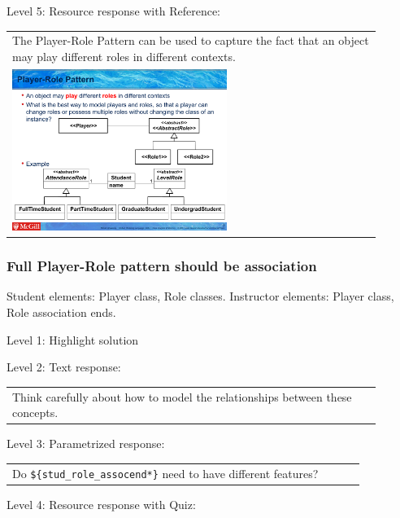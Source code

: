 \noindent Level 5: Resource response with Reference: \medskip

\begin{tabular}{|p{0.9\linewidth}}
The Player-Role Pattern can be used to capture the fact that an object may play different roles
in different contexts.

\\
\includegraphics[width=0.6\textwidth]{images/player_role.png}
\end{tabular} \medskip


\subsubsection{Full Player-Role pattern should be association}

Student elements: Player class, Role classes. Instructor elements: Player class, Role association ends. \medskip

\noindent Level 1: Highlight solution  \medskip

\noindent Level 2: Text response: \medskip

\begin{tabular}{|p{0.9\linewidth}}
Think carefully about how to model the relationships between these concepts.
\end{tabular} \medskip

\noindent Level 3: Parametrized response: \medskip

\begin{tabular}{|p{0.9\linewidth}}
Do \verb|${stud_role_assocend*}| need to have different features?
\end{tabular} \medskip

\noindent Level 4: Resource response with Quiz: \medskip


